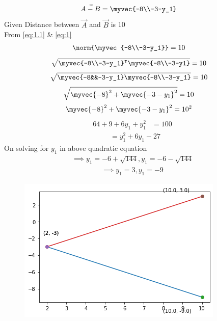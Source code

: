 \documentclass[journal,12pt,twocolumn]{IEEEtran}
\begin{document}
\begin{enumerate}
\begin{align}
\\\vec{A-B}&=\myvec{-8\\-3-y_1}  \label{eq:1}
\end{align}
Given Distance between $\vec{A}$ and $\vec{B}$ is 10
\\From \eqref{eq:1.1} & \eqref{eq:1}
\begin{align}
\norm{\myvec{-8\\-3-y_1}} &=10 \label{eq2}
\end{align}
\begin{align}
\sqrt{\myvec{-8\\-3-y_1}^\intercal\myvec{-8\\-3-y1}}&=10
\end{align}
\begin{align}
\sqrt{\myvec{-8&&-3-y_1}\myvec{-8\\-3-y_1}}&=10
\end{align}
\begin{align}
\sqrt{\myvec{-8}^2+\myvec{-3-y_1}^2}&=10\label{eq:1} \label{eq2}
\end{align}
\begin{align}
\myvec{-8}^2+\myvec{-3-y_1}^2&=10^2\label{eq:1} \label{eq2}
\end{align}
\begin{align}
64+9+6 y_1+y_1^2 &=100\label{eq:1} \label{eq2}
\end{align}
\begin{align}
&=y_1^2+6y_1-27\label{eq:1} \label{eq2}
\end{align}
On solving for $y_1$ in above quadratic equation
\begin{align}
\implies y_1=-6+\sqrt{144}, y_1=-6-\sqrt{144}
\end{align}
\begin{align}
\implies y_1=3, y_1=-9
\end{align}
\begin{figure}[!ht]
\includegraphics[width=\columnwidth]{download1.png}

\end{figure}
\end{enumerate}
\end{document}
